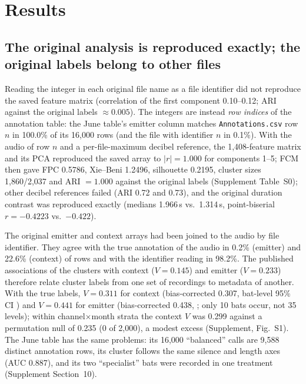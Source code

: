 \section{Results}
\subsection{The original analysis is reproduced exactly; the original labels belong to other files}
Reading the integer in each original file name as a file identifier did not reproduce the saved feature matrix (correlation of the first component 0.10--0.12; ARI against the original labels $\approx0.005$). The integers are instead \emph{row indices} of the annotation table: the June table's emitter column matches \texttt{Annotations.csv} row $n$ in 100.0\% of its 16,000 rows (and the file with identifier $n$ in 0.1\%). With the audio of row $n$ and a per-file-maximum decibel reference, the 1,408-feature matrix and its PCA reproduced the saved array to $|r|=1.000$ for components 1--5; FCM then gave FPC 0.5786, Xie--Beni 1.2496, silhouette 0.2195, cluster sizes 1,860/2,037 and ARI $=1.000$ against the original labels (Supplement Table~S0); other decibel references failed (ARI 0.72 and 0.73), and the original duration contrast was reproduced exactly (medians 1.966\,s vs.\ 1.314\,s, point-biserial $r=-0.4223$ vs.\ $-0.422$).

The original emitter and context arrays had been joined to the audio by file identifier. They agree with the true annotation of the audio in 0.2\% (emitter) and 22.6\% (context) of rows and with the identifier reading in 98.2\%. The published associations of the clusters with context ($V=0.145$) and emitter ($V=0.233$) therefore relate cluster labels from one set of recordings to metadata of another. With the true labels, $V=0.311$ for context (bias-corrected 0.307, bat-level 95\% CI ) and $V=0.441$ for emitter (bias-corrected 0.438, ; only 10 bats occur, not 35 levels); within channel$\times$month strata the context $V$ was 0.299 against a permutation null of 0.235 (0 of 2,000), a modest excess (Supplement, Fig.~S1). The June table has the same problems: its 16,000 ``balanced'' calls are 9,588 distinct annotation rows, its cluster follows the same silence and length axes (AUC 0.887), and its two ``specialist'' bats were recorded in one treatment (Supplement Section~10).

